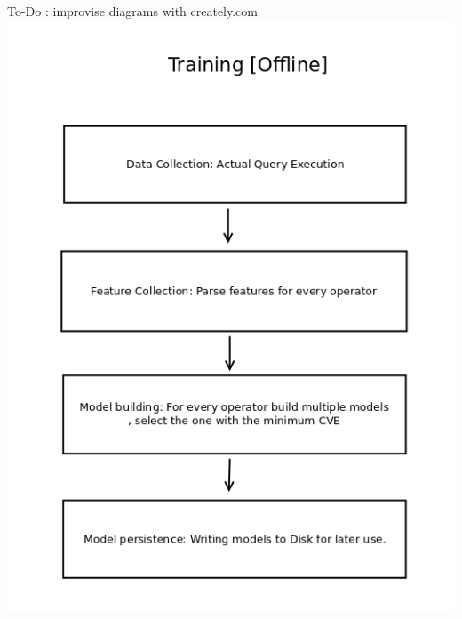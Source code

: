 \documentclass{article}
\begin{document}
\begin{multicols}{2}
	To-Do : improvise diagrams with creately.com \\
	\includegraphics[scale=0.3]{training.png}

\end{multicols}
\end{document}
